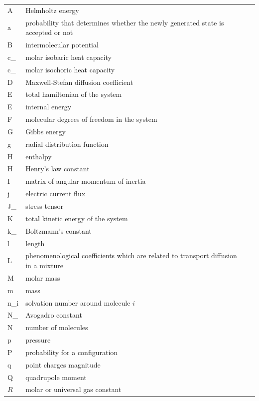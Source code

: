 {\begin{longtable}{Z B r}
		A    & Helmholtz energy &  \\
		a      &  probability that determines whether the newly generated state is accepted or not &  \\
		B     & intermolecular potential  &  \\ %
		c_   & molar isobaric heat capacity &  \\
		c_   & molar isochoric heat capacity &  \\
		D     & Maxwell-Stefan diffusion coefficient &  \\
		E     & total hamiltonian of the system &  \\
		E     & internal energy &  \\
		F     & molecular degrees of freedom in the system &  \\
		G     & Gibbs energy &  \\
		g     & radial distribution function &  \\
		H     & enthalpy &  \\
		H  & Henry’s law constant &  \\
		I     & matrix of angular momentum of inertia &  \\
		j_ & electric current flux &  \\
		J_   &  stress tensor &  \\
		K     & total kinetic energy of the system &  \\
		k_   & Boltzmann’s constant &  \\
		l     & length &  \\
		L & phenomenological coefficients which are related to transport diffusion in a mixture &  \\
		M     & molar mass &  \\
		m     & mass  &  \\
		n_i  & solvation number around molecule $i$ &  \\
		N_   & Avogadro constant &  \\
		N  & number of  molecules  &  \\
		p     & pressure &  \\
		P  & probability for a configuration &  \\
		q     & point charges magnitude &  \\
		Q     & quadrupole moment &  \\
		$\textit{R}$     & molar or universal gas constant &  \\

\end{longtable}}
